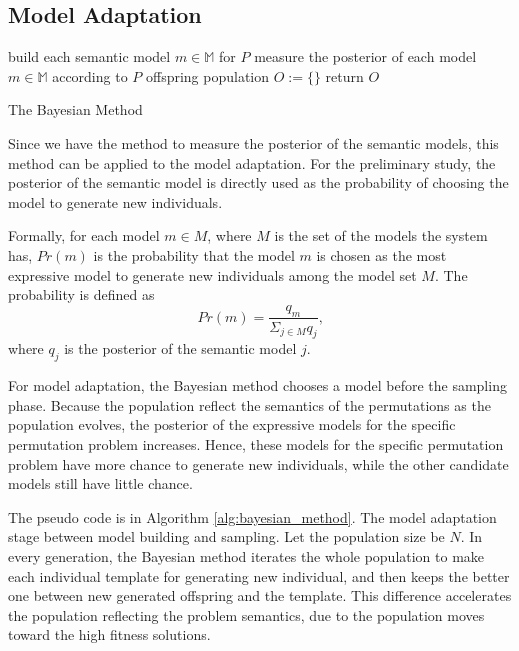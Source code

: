 \subsection{Model Adaptation}
{\LinesNumbered
\begin{algorithm}[htbp]


        build each semantic model $m \in \mathbb{M}$ for $P$\;
        measure the posterior of each model $m \in \mathbb{M}$ according to $P$\;
        offspring population $O := \{\}$\;
        return $O$\;
    \caption{The Bayesian Method}
    \label{alg:bayesian_method}
\end{algorithm}}
Since we have the method to measure the posterior of the semantic models, this method can be applied to the model adaptation. For the preliminary study, the posterior of the semantic model is directly used as the probability of choosing the model to generate new individuals.

Formally, for each model $m \in M$, where $M$ is the set of the models the system has, $Pr(m)$ is the probability that the model $m$ is chosen as the most expressive model to generate new individuals among the model set $M$. The probability is defined as
\begin{equation*}
    Pr(m) = \frac{q_m}{\Sigma_{j \in M} {q_j} }\text{,}
\end{equation*}
where $q_j$ is the posterior of the semantic model $j$. 

For model adaptation, the Bayesian method chooses a model before the sampling phase. Because the population reflect the semantics of the permutations as the population evolves, the posterior of the expressive models for the specific permutation problem increases. Hence, these models for the specific permutation problem have more chance to generate new individuals, while the other candidate models still have little chance.

The pseudo code is in Algorithm \ref{alg:bayesian_method}. The model adaptation stage between model building and sampling. Let the population size be $N$. In every generation, the Bayesian method  iterates the whole population to make each individual template for generating new individual, and then keeps the better one between new generated offspring and the template. This difference accelerates the population reflecting the problem semantics, due to the population moves toward the high fitness solutions.  


